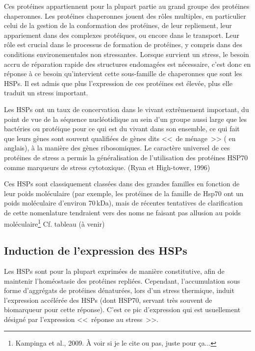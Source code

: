 
Ces protéines appartiennent pour la plupart partie au grand groupe des protéines chaperonnes\cite{federhoffmann1999}.
Les protéines chaperonnes jouent des rôles multiples, en particulier celui de la
gestion de la conformation des protéines, de leur repliement, leur appariement
dans des complexes protéiques, ou encore dans le transport. Leur rôle est crucial
dans le processus de formation de protéines, y compris dans des conditions environementales non stressantes.
Lorsque survient un stress, le besoin accru de réparation rapide des
structures endomagées est nécessaire, c'est donc en réponse à ce besoin qu'intervient
cette sous-famille de chaperonnes que sont les HSPs.
Il est admis que plus l'expression de ces protéines est élevée, plus elle traduit un stress important.

Les HSPs ont un taux de concervation dans le vivant extrêmement important, du point de vue de la séquence nucléotidique au sein d'un groupe aussi large que les bactéries ou protéique pour ce qui est du vivant dans son ensemble, ce
qui fait que leurs gènes sont souvent qualifiées de gènes dits <<~de ménage~>>
( en anglais), à la manière des gènes ribosomiques.
Le caractère universel de ces protéines de stress a permis la généralisation de l’utilisation des protéines HSP70 comme marqueurs de stress cytotoxique. (Ryan et High-tower, 1996) %


Ces HSPs sont classiquement classées dans des grandes familles en fonction de
leur poids moléculaire \cite{fink1999} (par exemple, les protéines de la
famille de Hsp70 ont un poids moléculaire d'environ 70\,kDa), mais de récentes
tentatives de clarification de cette nomenlature tendraient vers des noms ne
faisant pas allusion au poids moléculaire\footnote{Kampinga et al., 2009. À
voir si je le cite ou pas, juste pour ça...} Cf. tableau (à venir)


\subsection{Induction de l'expression des HSPs}

Les HSPs sont pour la plupart exprimées de manière constitutive, afin de maintenir l'homéostasie des protéines repliées.
Cependant, l'accumulation sous forme d'aggrégats de protéines dénaturées, lors d'un stress thermique, induit l'expression accélérée des HSPs (dont HSP70, servant très souvent de biomarqueur pour cette réponse).
C'est ce pic d'expression qui est usuellement désigné par l'expression <<~réponse au stress~>>.

